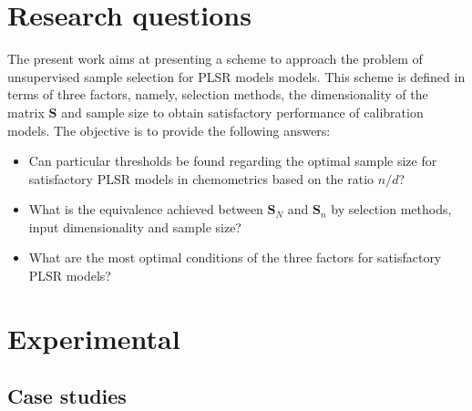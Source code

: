 \documentclass[journal=ancham,manuscript=article]{achemso}
\begin{document}

\section{Research questions}

The present work aims at presenting a scheme to approach the problem of unsupervised sample selection for PLSR models models. This scheme is defined in terms of three factors, namely, selection methods, the dimensionality of the matrix $\mathbf{S}$ and sample size to obtain satisfactory performance of calibration models. The objective is to provide the following answers:

\begin{itemize}

    \item Can particular thresholds be found regarding the optimal sample size for satisfactory PLSR models in chemometrics based on the ratio $n/d$?

    \item What is the equivalence achieved between $\mathbf{S}_N$ and $\mathbf{S}_n$ by selection methods, input dimensionality and sample size?
    
    \item What are the most optimal conditions of the three factors for satisfactory PLSR models?

\end{itemize}


\section{Experimental}\label{experimental}

\subsection{Case studies}\label{data}
\end{document}

